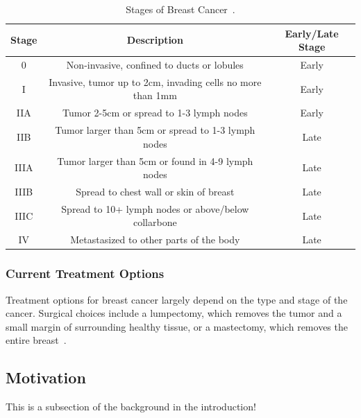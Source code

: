 \begin{table}[h!]
        \centering
        \caption{Stages of Breast Cancer~\cite{RefWorks:RefID:151-2025breast, RefWorks:RefID:365-stages}.}
        \label{tab:introduction:breastcancer:stages}
        \begin{tabular}{|c|c|c|}
                \hline
                \textbf{Stage} & \textbf{Description}                                       & \textbf{Early/Late Stage} \\
                \hline
                0              & Non-invasive, confined to ducts or lobules                 & Early                     \\
                \hline
                I              & Invasive, tumor up to 2cm, invading cells no more than 1mm & Early                     \\
                \hline
                IIA            & Tumor 2-5cm or spread to 1-3 lymph nodes                   & Early                     \\
                \hline
                IIB            & Tumor larger than 5cm or spread to 1-3 lymph nodes         & Late                      \\
                \hline
                IIIA           & Tumor larger than 5cm or found in 4-9 lymph nodes          & Late                      \\
                \hline
                IIIB           & Spread to chest wall or skin of breast                     & Late                      \\
                \hline
                IIIC           & Spread to 10+ lymph nodes or above/below collarbone        & Late                      \\
                \hline
                IV             & Metastasized to other parts of the body                    & Late                      \\
                \hline
        \end{tabular}
\end{table}

\subsubsection{Current Treatment Options\label{sec:introduction:breastcancer:currenttreatmentoptions}}
Treatment options for breast cancer largely depend on the type and stage of the cancer. Surgical choices include a lumpectomy, which removes the tumor and a small margin of surrounding healthy tissue, or a mastectomy, which removes the entire breast~\cite{RefWorks:RefID:165-czajka2023breast}.

\subsection{Motivation\label{sec:introduction:motivation}}
This is a subsection of the background in the introduction!
